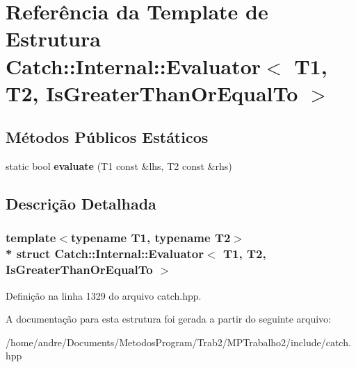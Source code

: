 \hypertarget{structCatch_1_1Internal_1_1Evaluator_3_01T1_00_01T2_00_01IsGreaterThanOrEqualTo_01_4}{}\section{Referência da Template de Estrutura Catch\+:\+:Internal\+:\+:Evaluator$<$ T1, T2, Is\+Greater\+Than\+Or\+Equal\+To $>$}
\label{structCatch_1_1Internal_1_1Evaluator_3_01T1_00_01T2_00_01IsGreaterThanOrEqualTo_01_4}
\subsection*{Métodos Públicos Estáticos}
\begin{DoxyCompactItemize}
\item 
static bool {\bfseries evaluate} (T1 const \&lhs, T2 const \&rhs)\hypertarget{structCatch_1_1Internal_1_1Evaluator_3_01T1_00_01T2_00_01IsGreaterThanOrEqualTo_01_4_a5ba107c6da4292b6492a0e5e906f9484}{}\label{structCatch_1_1Internal_1_1Evaluator_3_01T1_00_01T2_00_01IsGreaterThanOrEqualTo_01_4_a5ba107c6da4292b6492a0e5e906f9484}

\end{DoxyCompactItemize}


\subsection{Descrição Detalhada}
\subsubsection*{template$<$typename T1, typename T2$>$\\*
struct Catch\+::\+Internal\+::\+Evaluator$<$ T1, T2, Is\+Greater\+Than\+Or\+Equal\+To $>$}



Definição na linha 1329 do arquivo catch.\+hpp.



A documentação para esta estrutura foi gerada a partir do seguinte arquivo\+:\begin{DoxyCompactItemize}
\item 
/home/andre/\+Documents/\+Metodos\+Program/\+Trab2/\+M\+P\+Trabalho2/include/catch.\+hpp\end{DoxyCompactItemize}
